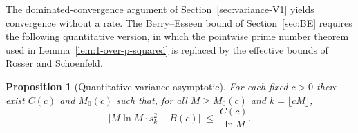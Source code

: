 \documentclass[11pt]{article}
\newtheorem{proposition}[theorem]{Proposition}
\theoremstyle{remark}
\begin{document}
The dominated-convergence argument of Section~\ref{sec:variance-V1} yields convergence without a rate. The Berry--Esseen bound of Section~\ref{sec:BE} requires the following quantitative version, in which the pointwise prime number theorem used in Lemma~\ref{lem:1-over-p-squared} is replaced by the effective bounds of Rosser and Schoenfeld.

\begin{proposition}[Quantitative variance asymptotic]\label{prop:variance-rate}
For each fixed $c > 0$ there exist $C(c)$ and $M_0(c)$ such that, for all $M \geq M_0(c)$ and $k = \lfloor cM \rfloor$,
\begin{equation}\label{eq:variance-rate}
\bigl| M \ln M \cdot s_k^2 - B(c) \bigr| \;\leq\; \frac{C(c)}{\ln M}.
\end{equation}
\end{proposition}
\end{document}

